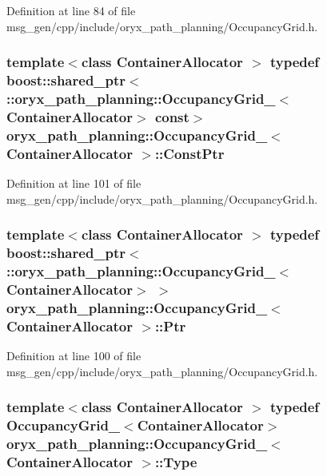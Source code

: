 \-Definition at line 84 of file msg\-\_\-gen/cpp/include/oryx\-\_\-path\-\_\-planning/\-Occupancy\-Grid.\-h.

\subsubsection[{\-Const\-Ptr}]{\setlength{\rightskip}{0pt plus 5cm}template$<$class Container\-Allocator $>$ typedef boost\-::shared\-\_\-ptr$<$ \-::{\bf oryx\-\_\-path\-\_\-planning\-::\-Occupancy\-Grid\-\_\-}$<$\-Container\-Allocator$>$ const$>$ {\bf oryx\-\_\-path\-\_\-planning\-::\-Occupancy\-Grid\-\_\-}$<$ \-Container\-Allocator $>$\-::{\bf \-Const\-Ptr}}\label{structoryx__path__planning_1_1OccupancyGrid___a5135c4f62fc8b836f029778dd2779975}


\-Definition at line 101 of file msg\-\_\-gen/cpp/include/oryx\-\_\-path\-\_\-planning/\-Occupancy\-Grid.\-h.

\subsubsection[{\-Ptr}]{\setlength{\rightskip}{0pt plus 5cm}template$<$class Container\-Allocator $>$ typedef boost\-::shared\-\_\-ptr$<$ \-::{\bf oryx\-\_\-path\-\_\-planning\-::\-Occupancy\-Grid\-\_\-}$<$\-Container\-Allocator$>$ $>$ {\bf oryx\-\_\-path\-\_\-planning\-::\-Occupancy\-Grid\-\_\-}$<$ \-Container\-Allocator $>$\-::{\bf \-Ptr}}\label{structoryx__path__planning_1_1OccupancyGrid___a0f4eaa764d7f387f922172a7b0e64d1c}


\-Definition at line 100 of file msg\-\_\-gen/cpp/include/oryx\-\_\-path\-\_\-planning/\-Occupancy\-Grid.\-h.

\subsubsection[{\-Type}]{\setlength{\rightskip}{0pt plus 5cm}template$<$class Container\-Allocator $>$ typedef {\bf \-Occupancy\-Grid\-\_\-}$<$\-Container\-Allocator$>$ {\bf oryx\-\_\-path\-\_\-planning\-::\-Occupancy\-Grid\-\_\-}$<$ \-Container\-Allocator $>$\-::{\bf \-Type}}\label{structoryx__path__planning_1_1OccupancyGrid___a6a95630e3ab05808bbf5018fecc39727}


